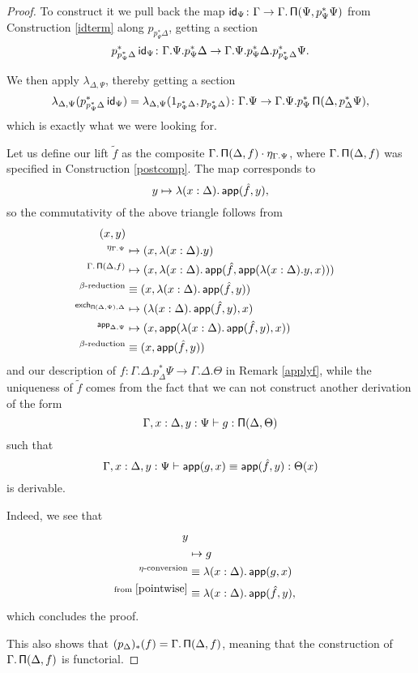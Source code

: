 \begin{proof}
  To construct it we pull back the map
  $\operatorname{\mathsf{id}}_{\Psi}\colon\Gamma\rightarrow\Gamma.\operatorname{\mathsf{\Pi}}(\Psi,p^*_\Psi\Psi)$ from
  Construction \ref{idterm} along $p_{p^*_\Psi\Delta}$, getting a section
  \[p^*_{p^*_\Psi\Delta}\operatorname{\mathsf{id}}_{\Psi}\colon\Gamma.\Psi.p^*_\Psi\Delta\rightarrow\Gamma.\Psi.p^*_\Psi\Delta.p^*_{p^*_\Psi\Delta}\Psi.\]

  We then apply $\lambda_{\Delta,\Psi}$, thereby getting a section
  \[\lambda_{\Delta,\Psi}(p^*_{p^*_\Psi\Delta}\operatorname{\mathsf{id}}_\Psi)
    =\lambda_{\Delta,\Psi}(1_{p^*_\Psi\Delta},p_{p^*_\Psi\Delta})
\colon\Gamma.\Psi\rightarrow\Gamma.\Psi.p^*_\Psi\operatorname{\mathsf{\Pi}}(\Delta,p^*_\Delta\Psi),\]
  which is exactly what we were looking for.

  Let us define our lift $\tilde{f}$ as the composite
  $\Gamma.\operatorname{\mathsf{\Pi}}(\Delta,f)\cdot\eta_{\Gamma.\Psi}$, where $\Gamma.\operatorname{\mathsf{\Pi}}(\Delta,f)$
  was specified in Construction \ref{postcomp}. The map corresponds to
  \[y\mapsto\lambda(x:\Delta).\operatorname{\mathsf{app}}(\hat{f},y),\] so the commutativity of the
  above triangle follows from
  \begin{align*}
    (x,y) \\
    ^{\eta_{\Gamma.\Psi}}
    &\mapsto(x,\lambda(x:\Delta).y) \\
    ^{\Gamma.\operatorname{\mathsf{\Pi}}(\Delta,f)}
    &\mapsto(x,\lambda(x:\Delta).\operatorname{\mathsf{app}}(\hat{f},\operatorname{\mathsf{app}}(\lambda(x:\Delta).y,x))) \\
    ^{\beta\text{-reduction}}
    &\equiv(x,\lambda(x:\Delta).\operatorname{\mathsf{app}}(\hat{f},y)) \\
    ^{\operatorname{\mathsf{exch}}_{\operatorname{\mathsf{\Pi}}(\Delta,\Psi),\Delta}}
    &\mapsto(\lambda(x:\Delta).\operatorname{\mathsf{app}}(\hat{f},y),x) \\
    ^{\operatorname{\mathsf{app}}_{\Delta,\Psi}}
    &\mapsto(x,\operatorname{\mathsf{app}}(\lambda(x:\Delta).\operatorname{\mathsf{app}}(\hat{f},y),x)) \\
    ^{\beta\text{-reduction}}
    &\equiv(x,\operatorname{\mathsf{app}}(\hat{f},y))
  \end{align*}
  and our description of
  $f\colon\Gamma.\Delta.p^*_\Delta\Psi\rightarrow\Gamma.\Delta.\Theta$ in
  Remark \ref{applyf}, while the
  uniqueness of $\tilde{f}$ comes from the fact that we can not construct
  another derivation of the form
  \[\Gamma,x:\Delta,y:\Psi\vdash g:\operatorname{\mathsf{\Pi}}(\Delta,\Theta)\]
  such that
  \begin{equation}\label{pointwise}
    \Gamma,x:\Delta,y:\Psi\vdash\operatorname{\mathsf{app}}(g,x)\equiv\operatorname{\mathsf{app}}(\hat{f},y):\Theta(x)
  \end{equation}
  is derivable.

  Indeed, we see that
  \begin{align*}
    y \\
        &\mapsto g \\
        ^{\eta\text{-conversion}}&\equiv\lambda(x:\Delta).\operatorname{\mathsf{app}}(g,x) \\
        ^{\text{from }\ref{pointwise}}&\equiv\lambda(x:\Delta).\operatorname{\mathsf{app}}(\hat{f},y),
  \end{align*}
  which concludes the proof.

  This also shows that $(p_{\Delta})_*(f)=\Gamma.\operatorname{\mathsf{\Pi}}(\Delta,f)$, meaning that
  the construction of $\Gamma.\operatorname{\mathsf{\Pi}}(\Delta,f)$ is functorial.
\end{proof}

